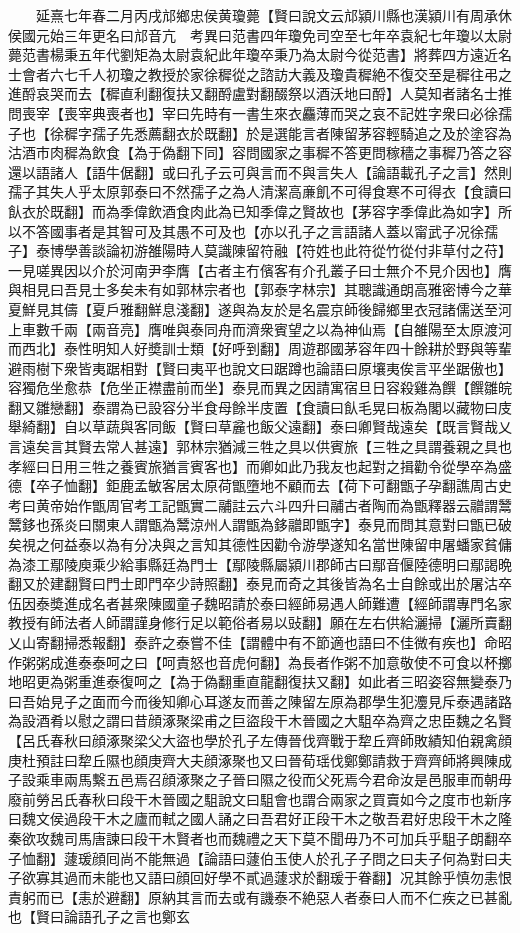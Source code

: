 　　延熹七年春二月丙戌邟鄉忠侯黄瓊薨【賢曰說文云邟潁川縣也漢潁川有周承休侯國元始三年更名曰邟音亢　考異曰范書四年瓊免司空至七年卒袁紀七年瓊以太尉薨范書楊秉五年代劉矩為太尉袁紀此年瓊卒秉乃為太尉今從范書】將葬四方遠近名士會者六七千人初瓊之教授於家徐穉從之諮訪大義及瓊貴穉絶不復交至是穉往弔之進酹哀哭而去【穉直利翻復扶又翻酹盧對翻醊祭以酒沃地曰酹】人莫知者諸名士推問喪宰【喪宰典喪者也】宰曰先時有一書生來衣麤薄而哭之哀不記姓字衆曰必徐孺子也【徐穉字孺子先悉薦翻衣於既翻】於是選能言者陳留茅容輕騎追之及於塗容為沽酒市肉穉為飲食【為于偽翻下同】容問國家之事穉不答更問稼穡之事穉乃答之容還以語諸人【語牛倨翻】或曰孔子云可與言而不與言失人【論語載孔子之言】然則孺子其失人乎太原郭泰曰不然孺子之為人清潔高亷飢不可得食寒不可得衣【食讀曰飤衣於既翻】而為季偉飲酒食肉此為已知季偉之賢故也【茅容字季偉此為如字】所以不答國事者是其智可及其愚不可及也【亦以孔子之言語諸人蓋以甯武子况徐孺子】泰博學善談論初游雒陽時人莫識陳留符融【符姓也此符從竹從付非草付之苻】一見嗟異因以介於河南尹李膺【古者主冇儐客有介孔叢子曰士無介不見介因也】膺與相見曰吾見士多矣未有如郭林宗者也【郭泰字林宗】其聰識通朗高雅密博今之華夏鮮見其儔【夏戶雅翻鮮息淺翻】遂與為友於是名震京師後歸鄉里衣冠諸儒送至河上車數千兩【兩音亮】膺唯與泰同舟而濟衆賓望之以為神仙焉【自雒陽至太原渡河而西北】泰性明知人好奬訓士類【好呼到翻】周遊郡國茅容年四十餘耕於野與等輩避雨樹下衆皆夷踞相對【賢曰夷平也說文曰踞蹲也論語曰原壤夷俟言平坐踞傲也】容獨危坐愈恭【危坐正襟盡前而坐】泰見而異之因請寓宿旦日容殺雞為饌【饌雛皖翻又雛戀翻】泰謂為已設容分半食母餘半庋置【食讀曰飤毛晃曰板為閣以藏物曰庋舉綺翻】自以草蔬與客同飯【賢曰草麄也飯父遠翻】泰曰卿賢哉遠矣【既言賢哉乂言遠矣言其賢去常人甚遠】郭林宗猶減三牲之具以供賓旅【三牲之具謂養親之具也孝經曰日用三牲之養賓旅猶言賓客也】而卿如此乃我友也起對之揖勸令從學卒為盛德【卒子恤翻】鉅鹿孟敏客居太原荷甑墮地不顧而去【荷下可翻甑子孕翻譙周古史考曰黄帝始作甑周官考工記甑實二鬴註云六斗四升曰鬴古者陶而為甑釋器云䰝謂鬵鬵鉹也孫炎曰關東人謂甑為鬵涼州人謂甑為鉹䰝即甑字】泰見而問其意對曰甑已破矣視之何益泰以為有分决與之言知其德性因勸令游學遂知名當世陳留申屠蟠家貧傭為漆工鄢陵庾乘少給事縣廷為門士【鄢陵縣屬潁川郡師古曰鄢音偃陸德明曰鄢謁晩翻又於建翻賢曰門士即門卒少詩照翻】泰見而奇之其後皆為名士自餘或出於屠沽卒伍因泰奬進成名者甚衆陳國童子魏昭請於泰曰經師易遇人師難遭【經師謂專門名家教授有師法者人師謂謹身修行足以範俗者易以䜴翻】願在左右供給灑掃【灑所賣翻乂山寄翻掃悉報翻】泰許之泰嘗不佳【謂體中有不節適也語曰不佳微有疾也】命昭作粥粥成進泰泰呵之曰【呵責怒也音虎何翻】為長者作粥不加意敬使不可食以杯擲地昭更為粥重進泰復呵之【為于偽翻重直龍翻復扶又翻】如此者三昭姿容無變泰乃曰吾始見子之面而今而後知卿心耳遂友而善之陳留左原為郡學生犯灋見斥泰遇諸路為設酒肴以慰之謂曰昔顔涿聚梁甫之巨盜段干木晉國之大駔卒為齊之忠臣魏之名賢【呂氏春秋曰顔涿聚梁父大盜也學於孔子左傳晉伐齊戰于犂丘齊師敗績知伯親禽顔庚杜預註曰犂丘隰也顔庚齊大夫顔涿聚也又曰晉荀瑶伐鄭鄭請救于齊齊師將興陳成子設乘車兩馬繫五邑焉召顔涿聚之子晉曰隰之役而父死焉今君命汝是邑服車而朝毋廢前勞呂氏春秋曰段干木晉國之駔說文曰駔會也謂合兩家之買賣如今之度市也新序曰魏文侯過段干木之廬而軾之國人誦之曰吾君好正段干木之敬吾君好忠段干木之隆秦欲攻魏司馬唐諫曰段干木賢者也而魏禮之天下莫不聞毋乃不可加兵乎駔子朗翻卒子恤翻】蘧瑗顔囘尚不能無過【論語曰蘧伯玉使人於孔子子問之曰夫子何為對曰夫子欲寡其過而未能也又語曰顔回好學不貳過蘧求於翻瑗于眷翻】况其餘乎慎勿恚恨責躬而已【恚於避翻】原納其言而去或有譏泰不絶惡人者泰曰人而不仁疾之已甚亂也【賢曰論語孔子之言也鄭玄